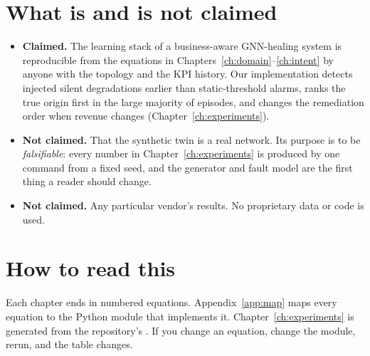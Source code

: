 \section*{What is and is not claimed}
\begin{itemize}[nosep]
  \item \textbf{Claimed.} The learning stack of a business-aware GNN-healing system is reproducible
  from the equations in Chapters~\ref{ch:domain}--\ref{ch:intent} by anyone with the topology and the
  KPI history. Our implementation detects injected silent degradations earlier than static-threshold
  alarms, ranks the true origin first in the large majority of episodes, and changes the remediation
  order when revenue changes (Chapter~\ref{ch:experiments}).
  \item \textbf{Not claimed.} That the synthetic twin is a real network. Its purpose is to be
  \emph{falsifiable}: every number in Chapter~\ref{ch:experiments} is produced by one command from a
  fixed seed, and the generator and fault model are the first thing a reader should change.
  \item \textbf{Not claimed.} Any particular vendor's results. No proprietary data or code is used.
\end{itemize}

\section*{How to read this}
Each chapter ends in numbered equations. Appendix~\ref{app:map} maps every equation to the Python
module that implements it. Chapter~\ref{ch:experiments} is generated from the repository's
. If you change an equation, change the module, rerun, and the table changes.
